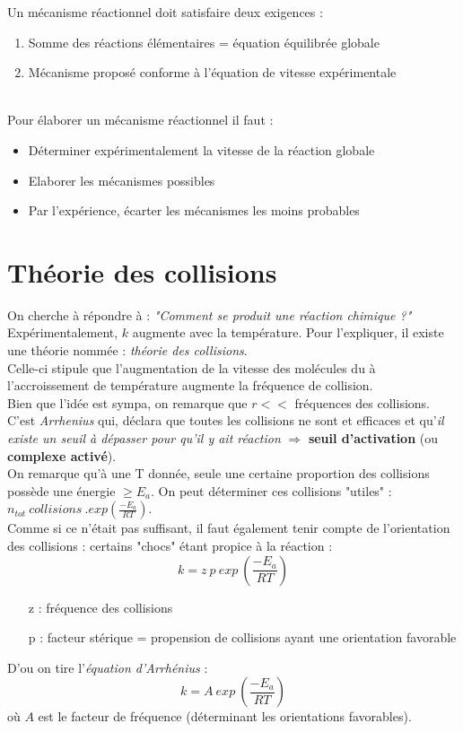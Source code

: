 \documentclass[british,french,11pt, a4paper, openany]{book}
\begin{document}
Un mécanisme réactionnel doit satisfaire deux exigences :
\begin{enumerate}
	\item Somme des réactions élémentaires = équation équilibrée globale
	\item Mécanisme proposé conforme à l'équation de vitesse expérimentale
\end{enumerate}\ \\
Pour élaborer un mécanisme réactionnel il faut :
\begin{itemize}
	\item Déterminer expérimentalement la vitesse de la réaction globale
	\item Elaborer les mécanismes possibles
	\item Par l'expérience, écarter les mécanismes les moins probables
\end{itemize}


\section{Théorie des collisions}
On cherche à répondre à : \textit{"Comment se produit une réaction chimique ?"}\\
Expérimentalement, $k$ augmente avec la température. Pour l'expliquer, il existe une théorie nommée : \textit{théorie des collisions}.\\

Celle-ci stipule que l'augmentation de la vitesse des molécules du à l'accroissement de température augmente la fréquence de collision.\\

Bien que l'idée est sympa, on remarque que $r <<$ fréquences des collisions. C'est \textit{Arrhenius} qui, déclara que toutes les collisions ne sont et efficaces et qu'\textit{il existe un seuil à dépasser pour qu'il y ait réaction} $\Rightarrow$ \textbf{seuil d'activation} (ou \textbf{complexe activé}).\\

On remarque qu'à une T donnée, seule une certaine proportion des collisions possède une énergie $\geq E_a$. On peut déterminer ces collisions "utiles" : $n_{tot}\ collisions\ . exp(\frac{-E_a}{RT})$.\\

Comme si ce n'était pas suffisant, il faut également tenir compte de l'orientation des collisions : certains "chocs" étant propice à la réaction :
$$k = z\ p\ exp\ (\frac{-E_a}{RT})$$
\begin{itemize}
	\item[z] : fréquence des collisions
	\item[p] : facteur stérique = propension de collisions ayant une orientation favorable
\end{itemize}
D'ou on tire l'\textit{équation d'Arrhénius} :
$$k = A\ exp\ (\frac{-E_a}{RT})$$
où $A$ est le facteur de fréquence (déterminant les orientations favorables).
\end{document}
